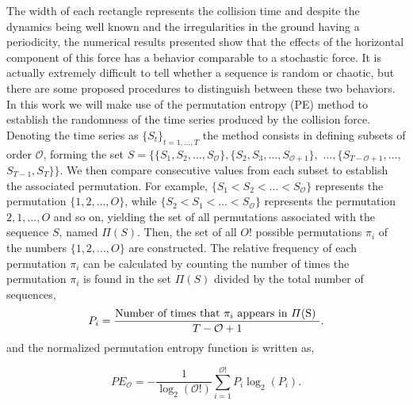 \documentclass[reprint, aps, pre,nofootinbib]{revtex4-1}
\begin{document}
The width of each rectangle represents the collision time and despite
the dynamics being well known and the irregularities in the ground
having a periodicity, the numerical results presented show that the
effects of the horizontal component of this force has a behavior comparable
to a stochastic force. It is actually extremely difficult to tell
whether a sequence is random or chaotic, but there are some proposed
procedures to distinguish between these two behaviors. In this work
we will make use of the permutation entropy (PE) method \citep{Bandt,Riedl2013}
to establish the randomness of the time series produced by the collision
force. Denoting the time series as $\{S_{t}\}_{t=1,\ldots,T}$ the
method consists in defining subsets of order $\mathcal{O}$, forming
the set $S=\{\{S_{1},S_{2},\ldots,S_{\mathcal{O}}\},\{S_{2},S_{3},\ldots,S_{\mathcal{O}+1}\},$
$\ldots,\{S_{T-\mathcal{O}+1},\ldots,$ $S_{T-1},S_{T}\}\}$. We then
compare consecutive values from each subset to establish the associated
permutation. For example, $\{S_{1}<S_{2}<\ldots<S_{\mathcal{O}}\}$
represents the permutation $\{1,2,...,O\}$, while $\{S_{2}<S_{1}<\ldots<S_{\mathcal{O}}\}$
represents the permutation ${2,1,...,O}$ and so on, yielding the
set of all permutations associated with the sequence $S$, named $\varPi(S)$.
Then, the set of all $O!$ possible permutations $\pi_{i}$ of the
numbers $\{1,2,...,O\}$ are constructed. The relative frequency of
each permutation $\pi_{i}$ can be calculated by counting the number
of times the permutation $\pi_{i}$ is found in the set $\varPi(S)$
divided by the total number of sequences,
\begin{equation}
P_{i}=\frac{\textrm{Number of times that \ensuremath{\pi_{i}} appears in \ensuremath{\varPi}(S) }}{T-\mathcal{O}+1}.\label{probabil}
\end{equation}
and the normalized permutation entropy function is written as, 

\begin{equation}
PE_{\mathcal{O}}=-\frac{1}{\log_{2}(\mathcal{O}!)}\sum_{i=1}^{\mathcal{O}!}P_{i}\log_{2}(P_{i}).\label{entropy}
\end{equation}
\end{document}
